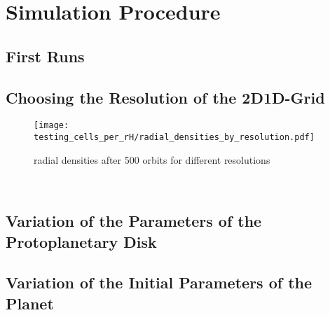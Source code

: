
\chapter{Simulation Procedure}

  \section{First Runs}

  \section{Choosing the Resolution of the 2D1D-Grid}
    \begin{figure}[h!]
      \centering
      \texttt{[image: testing\_cells\_per\_rH/radial\_densities\_by\_resolution.pdf]}
      \caption{radial densities after 500 orbits for different resolutions}
      \label{}
    \end{figure} \ \\ 

  \section{Variation of the Parameters of the Protoplanetary Disk}




  \section{Variation of the Initial Parameters of the Planet}




